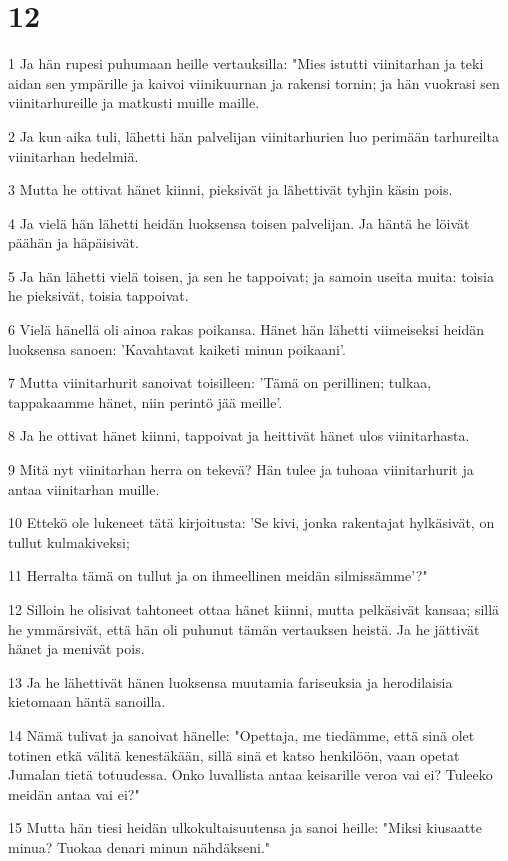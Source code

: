 \chapter{12}

\par 1 Ja hän rupesi puhumaan heille vertauksilla: "Mies istutti viinitarhan ja teki aidan sen ympärille ja kaivoi viinikuurnan ja rakensi tornin; ja hän vuokrasi sen viinitarhureille ja matkusti muille maille.
\par 2 Ja kun aika tuli, lähetti hän palvelijan viinitarhurien luo perimään tarhureilta viinitarhan hedelmiä.
\par 3 Mutta he ottivat hänet kiinni, pieksivät ja lähettivät tyhjin käsin pois.
\par 4 Ja vielä hän lähetti heidän luoksensa toisen palvelijan. Ja häntä he löivät päähän ja häpäisivät.
\par 5 Ja hän lähetti vielä toisen, ja sen he tappoivat; ja samoin useita muita: toisia he pieksivät, toisia tappoivat.
\par 6 Vielä hänellä oli ainoa rakas poikansa. Hänet hän lähetti viimeiseksi heidän luoksensa sanoen: 'Kavahtavat kaiketi minun poikaani'.
\par 7 Mutta viinitarhurit sanoivat toisilleen: 'Tämä on perillinen; tulkaa, tappakaamme hänet, niin perintö jää meille'.
\par 8 Ja he ottivat hänet kiinni, tappoivat ja heittivät hänet ulos viinitarhasta.
\par 9 Mitä nyt viinitarhan herra on tekevä? Hän tulee ja tuhoaa viinitarhurit ja antaa viinitarhan muille.
\par 10 Ettekö ole lukeneet tätä kirjoitusta: 'Se kivi, jonka rakentajat hylkäsivät, on tullut kulmakiveksi;
\par 11 Herralta tämä on tullut ja on ihmeellinen meidän silmissämme'?"
\par 12 Silloin he olisivat tahtoneet ottaa hänet kiinni, mutta pelkäsivät kansaa; sillä he ymmärsivät, että hän oli puhunut tämän vertauksen heistä. Ja he jättivät hänet ja menivät pois.
\par 13 Ja he lähettivät hänen luoksensa muutamia fariseuksia ja herodilaisia kietomaan häntä sanoilla.
\par 14 Nämä tulivat ja sanoivat hänelle: "Opettaja, me tiedämme, että sinä olet totinen etkä välitä kenestäkään, sillä sinä et katso henkilöön, vaan opetat Jumalan tietä totuudessa. Onko luvallista antaa keisarille veroa vai ei? Tuleeko meidän antaa vai ei?"
\par 15 Mutta hän tiesi heidän ulkokultaisuutensa ja sanoi heille: "Miksi kiusaatte minua? Tuokaa denari minun nähdäkseni."
